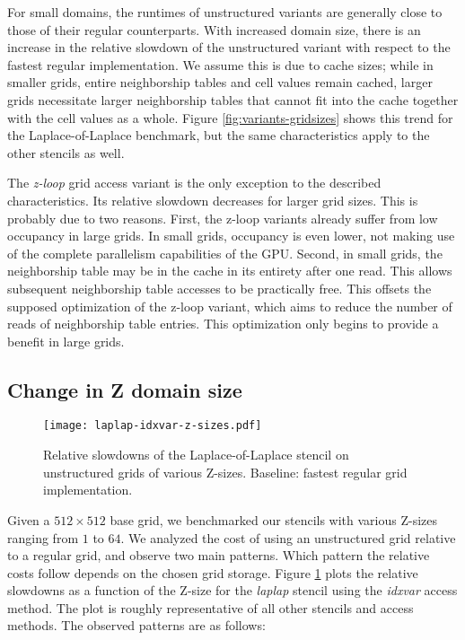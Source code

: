 For small domains, the runtimes of unstructured variants are generally close to those of their regular counterparts. With increased domain size, there is an increase in the relative slowdown of the unstructured variant with respect to the fastest regular implementation. We assume this is due to cache sizes; while in smaller grids, entire neighborship tables and cell values remain cached, larger grids necessitate larger neighborship tables that cannot fit into the cache together with the cell values as a whole. Figure \ref{fig:variants-gridsizes} shows this trend for the Laplace-of-Laplace benchmark, but the same characteristics apply to the other stencils as well.

The \emph{z-loop} grid access variant is the only exception to the described characteristics. Its relative slowdown decreases for larger grid sizes. This is probably due to two reasons. First, the z-loop variants already suffer from low occupancy in large grids. In small grids, occupancy is even lower, not making use of the complete parallelism capabilities of the GPU. Second, in small grids, the neighborship table may be in the cache in its entirety after one read. This allows subsequent neighborship table accesses to be practically free. This offsets the supposed optimization of the z-loop variant, which aims to reduce the number of reads of neighborship table entries. This optimization only begins to provide a benefit in large grids.

\subsection{Change in Z domain size}
\label{sec:res-z-size-change}

\begin{figure}
    \texttt{[image: laplap-idxvar-z-sizes.pdf]}
    \caption{\label{fig:laplap-z-sizes} Relative slowdowns of the Laplace-of-Laplace stencil on unstructured grids of various Z-sizes. Baseline: fastest regular grid implementation.}
\end{figure}

Given a $512\times 512$ base grid, we benchmarked our stencils with various Z-sizes ranging from $1$ to $64$. We analyzed the cost of using an unstructured grid relative to a regular grid, and observe two main patterns. Which pattern the relative costs follow depends on the chosen grid storage. Figure \ref{fig:laplap-z-sizes} plots the relative slowdowns as a function of the Z-size for the \emph{laplap} stencil using the \emph{idxvar} access method. The plot is roughly representative of all other stencils and access methods. The observed patterns are as follows:

